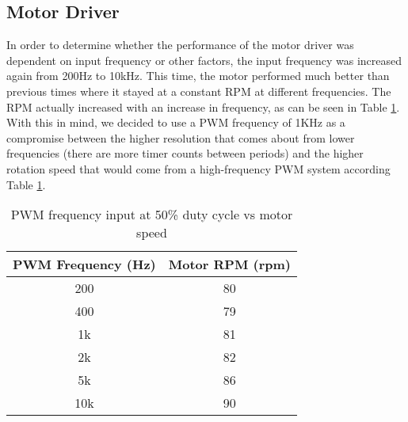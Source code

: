 \subsection{Motor Driver}
In order to determine whether the performance of the motor driver was dependent on input frequency or other factors, the input frequency was increased again from 200Hz to 10kHz. This time, the motor performed much better than previous times where it stayed at a constant RPM at different frequencies. The RPM actually increased with an increase in frequency, as can be seen in Table \ref{tbl:freq-test}. With this in mind, we decided to use a PWM frequency of 1KHz as a compromise between the higher resolution that comes about from lower frequencies (there are more timer counts between periods) and the higher rotation speed that would come from a high-frequency PWM system according Table \ref{tbl:freq-test}.

\begin{table}[H]
	\centering
	\caption{PWM frequency input at 50\% duty cycle vs motor speed}
	\begin{tabular}{| c | c |}
		\hline
		PWM Frequency (Hz) & Motor RPM (rpm) \\
		\hline
		200 & 80 \\
		400 & 79 \\
		1k & 81 \\
		2k & 82 \\
		5k & 86 \\
		10k & 90 \\
		\hline
	\end{tabular}
	\label{tbl:freq-test}
\end{table}


